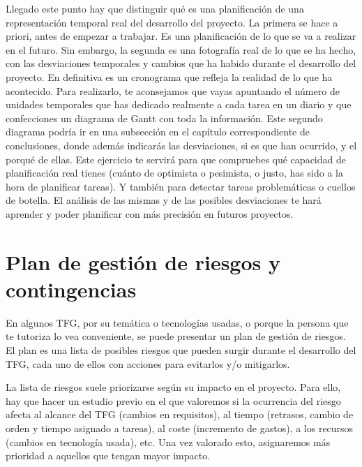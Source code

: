 Llegado este punto hay que distinguir qué es una planificación de una representación temporal real del desarrollo del proyecto. La primera se hace a priori, antes de empezar a trabajar. Es una planificación de lo que se va a realizar en el futuro. Sin embargo, la segunda es una fotografía real de lo que se ha hecho, con las desviaciones temporales y cambios que ha habido durante el desarrollo del proyecto. En definitiva es un cronograma que refleja la realidad de lo que ha acontecido. Para realizarlo, te aconsejamos que vayas apuntando el número de unidades temporales que has dedicado realmente a cada tarea en un diario y que confecciones un diagrama de Gantt con toda la información. Este segundo diagrama podría ir en una subsección en el capítulo correspondiente de conclusiones, donde además indicarás las desviaciones, si es que han ocurrido, y el porqué de ellas. Este ejercicio te servirá para que compruebes qué capacidad de planificación real tienes (cuánto de optimista o pesimista, o justo, has sido a la hora de planificar tareas). Y también para detectar tareas problemáticas o cuellos de botella. El análisis de las mismas y de las posibles desviaciones te hará aprender y poder planificar con más precisión en futuros proyectos. 



\section{Plan de gestión de riesgos y contingencias}

En algunos TFG, por su temática o tecnologías usadas, o porque la persona que te tutoriza lo vea conveniente, se puede presentar un plan de gestión de riesgos. El plan es una lista de posibles riesgos que pueden surgir durante el desarrollo del TFG, cada uno de ellos con acciones para evitarlos y/o mitigarlos. 

La lista de riesgos suele priorizarse según su impacto en el proyecto. Para ello, hay que hacer un estudio previo en el que valoremos si la ocurrencia del riesgo afecta al alcance del TFG (cambios en requisitos), al tiempo (retrasos, cambio de orden y tiempo asignado a tareas), al coste (incremento de gastos), a los recursos (cambios en tecnología usada), etc. Una vez valorado esto, asignaremos más prioridad a aquellos que tengan mayor impacto. 

